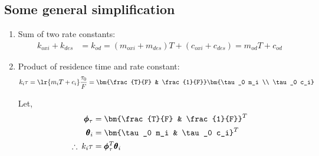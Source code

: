 \subsection{Some general simplification}
\begin{enumerate}
        \item Sum of two rate constants:
        \begin{align}
                k_{oxi} + k_{des} &= k_{od} = (m_{oxi} + m_{des}) T + (c_{oxi} + c_{des}) = m_{od} T + c_{od} \label{eqn::k_sum}
        \end{align}

        \item Product of residence time and rate constant:
        \begin{align*}
        k_i \tau  = \lr{m_i T + c_i} \frac{\tau_0}{F} = \bm{\frac{T}{F} & \frac{1}{F}} \bm{\tau_0 m_i \\ \tau_0 c_i}
        \end{align*}

        Let,
        \begin{align}
                \pmb \phi_\tau &= \bm{\frac{T}{F} & \frac{1}{F}}^T  \label{eqn::phi_tau}\\
                \pmb \theta_i &= \bm{\tau_0 m_i &
                                     \tau_0 c_i}^T          \label{eqn::theta_i}\\
                \therefore \: k_i \tau &= \pmb \phi_\tau^T \pmb \theta_i   \label{eqn::tau_ki}
        \end{align}



\end{enumerate}
